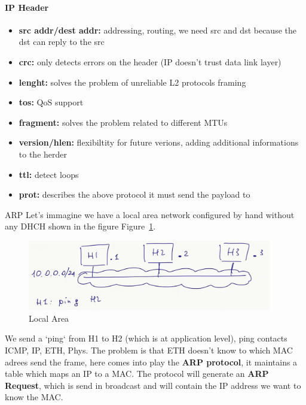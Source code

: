 \documentclass[12pt]{article}
\begin{document}
\paragraph{IP Header}
\begin{itemize}
  \item \textbf{src addr/dest addr:} addressing, routing, we need src and dst because the dst can reply to the src
  \item \textbf{crc:} only detects errors on the header (IP doesn't trust data link layer)
  \item \textbf{lenght:} solves the problem of unreliable L2 protocols framing
  \item \textbf{tos:} QoS support
  \item \textbf{fragment:} solves the problem related to different MTUs
  \item \textbf{version/hlen:} flexibiltity for future verions, adding additional informations to the herder 
  \item \textbf{ttl:} detect loops
  \item \textbf{prot:} describes the above protocol it must send the payload to
\end{itemize}

ARP
Let's immagine we have a local area network configured by hand without any DHCH shown in the figure Figure~\ref{fig:local-area}.
\begin{figure}
  \centering
  \includegraphics[width=0.95\textwidth]{./img/local-area.png}
  \caption{Local Area}\label{fig:local-area}
\end{figure}
We send a `ping` from H1 to H2 (which is at application level), ping contacts ICMP, IP, ETH, Phys. The problem is that ETH doesn't know to which MAC adrees send the frame, here comes into play the \textbf{ARP protocol}, it maintains a table which maps an IP to a MAC. The protocol will generate an \textbf{ARP Request}, which is send in broadcast and will contain the IP address we want to know the MAC.
\end{document}
